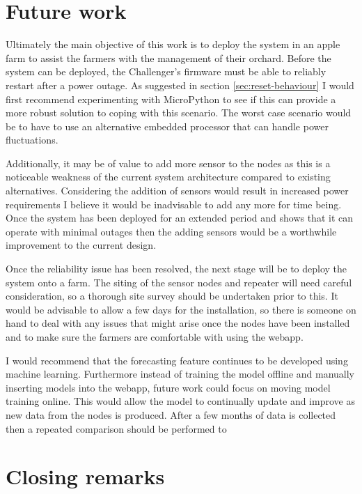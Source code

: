 \section{Future work}\label{sec:future-work}

Ultimately the main objective of this work is to deploy the system in an apple
farm to assist the farmers with the management of their orchard. Before the
system can be deployed, the Challenger's firmware must be able to reliably
restart after a power outage.  As suggested in section \ref{sec:reset-behaviour}
I would first recommend experimenting with MicroPython to see if this can
provide a more robust solution to coping with this scenario. The worst case
scenario would be to have to use an alternative embedded processor that can
handle power fluctuations.

Additionally, it may be of value to add more sensor to the nodes as this is a
noticeable weakness of the current system architecture compared to existing
alternatives. Considering the addition of sensors would result in increased
power requirements I believe it would be inadvisable to add any more for time
being. Once the system has been deployed for an extended period and shows that
it can operate with minimal outages then the adding sensors would be a
worthwhile improvement to the current design.

Once the reliability issue has been resolved, the next stage will be to deploy
the system onto a farm.  The siting of the sensor nodes and repeater will need
careful consideration, so a thorough site survey should be undertaken prior to
this. It would be advisable to allow a few days for the installation, so there
is someone on hand to deal with any issues that might arise once the nodes have
been installed and to make sure the farmers are comfortable with using the
webapp.

I would recommend that the forecasting feature continues to be developed using
machine learning. Furthermore instead of training the model offline and manually
inserting models into the webapp, future work could focus on moving model
training online. This would allow the model to continually update and improve as
new data from the nodes is produced. After a few months of data is collected
then a repeated comparison should be performed to 


\section{Closing remarks}


